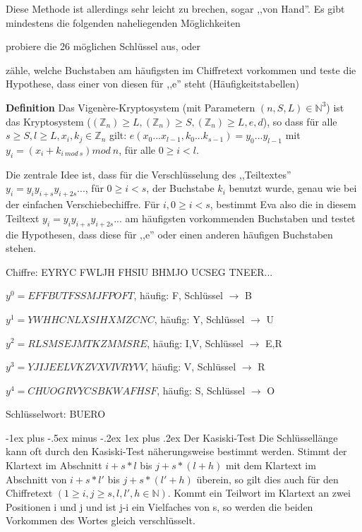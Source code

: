 \documentclass[a4paper]{article}
\makeatletter
\renewcommand{\subsubsection}{\@startsection{subsubsection}{3}{0mm}%
 {-1ex plus -.5ex minus -.2ex}%
 {1ex plus .2ex}%
 {\normalfont\small\bfseries}}
\makeatother
\begin{document}
\begin{multicols}{3}
    Diese Methode ist allerdings sehr leicht zu brechen, sogar ,,von Hand''. Es gibt mindestens die folgenden naheliegenden Möglichkeiten
    \begin{enumerate*}
        \item probiere die 26 möglichen Schlüssel aus, oder
        \item zähle, welche Buchstaben am häufigsten im Chiffretext vorkommen und teste die Hypothese, dass einer von diesen für ,,e'' steht (Häufigkeitstabellen)
    \end{enumerate*}

    \textbf{Definition} Das Vigenère-Kryptosystem (mit Parametern $(n,S,L)\in\mathbb{N}^3$) ist das Kryptosystem ($(\mathbb{Z}_n)\geq L,(\mathbb{Z}_n)\geq S,(\mathbb{Z}_n)\geq L,e,d$), so dass für alle $s\geq S,l\geq L,x_i,k_j\in\mathbb{Z}_n$ gilt: $e(x_0...x_{l-1},k_0 ...k_{s-1})=y_0 ...y_{l-1}$ mit $y_i=(x_i+k_{i\ mod\ s}) mod\ n$, für alle $0\geq i < l$.

    Die zentrale Idee ist, dass für die Verschlüsselung des ,,Teiltextes'' $y_i=y_iy_{i+s}y_{i+2s}...$, für $0\geq i<s$, der Buchstabe $k_i$ benutzt wurde, genau wie bei der einfachen Verschiebechiffre. Für $i,0\geq i<s$, bestimmt Eva also die in diesem Teiltext $y_i=y_iy_{i+s}y_{i+2s}...$ am häufigsten vorkommenden Buchstaben und testet die Hypothesen, dass diese für ,,e'' oder einen anderen häufigen Buchstaben stehen.

    \begin{itemize*}
        \item Chiffre: EYRYC FWLJH FHSIU BHMJO UCSEG TNEER...
        \item $y^0 =EFFBUTFSSMJFPOFT$, häufig: F, Schlüssel $\rightarrow$ B
        \item $y^1 =YWHHCNLXSIHXMZCNC$, häufig: Y, Schlüssel $\rightarrow$ U
        \item $y^2 =RLSMSEJMTKZMMSRE$, häufig: I,V, Schlüssel $\rightarrow$ E,R
        \item $y^3 =YJIJEELVKZVXVIVRYVV$, häufig: V, Schlüssel $\rightarrow$ R
        \item $y^4 =CHUOGRVYCSBKWAFHSF$, häufig: S, Schlüssel $\rightarrow$ O
        \item Schlüsselwort: BUERO
    \end{itemize*}

    \subsubsection{Der Kasiski-Test}
    Die Schlüssellänge kann oft durch den Kasiski-Test näherungsweise bestimmt werden. Stimmt der Klartext im Abschnitt $i+s*l$ bis $j+s*(l+h)$ mit dem Klartext im Abschnitt von $i+s*l'$ bis $j+s*(l'+h)$ überein, so gilt dies auch für den Chiffretext $(1\geq i,j\geq s,l,l',h\in\mathbb{N})$. Kommt ein Teilwort im Klartext an zwei Positionen i und j und ist j-i ein Vielfaches von s, so werden die beiden Vorkommen des Wortes gleich verschlüsselt.


\end{multicols}
\end{document}
